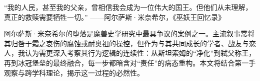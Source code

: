 \hspace*{2em} 
“我的人民，甚至我的父亲，曾相信我会成为一位伟大的国王。但他们从未理解，真正的救赎需要牺牲一切。”
——阿尔萨斯·米奈希尔，《巫妖王回忆录》

阿尔萨斯·米奈希尔的堕落是魔兽史学研究中最具争议的案例之一。主流叙事常将其归咎于霜之哀伤的腐蚀或耐奥祖的操控，但作为与其共同成长的学者、战友与恋人，我认为需更深入考察其行为逻辑的连续性：从斯坦索姆的“净化”到弑父称王，再到冰冠堡垒的最终融合，每一步都暗含对“责任”的病态重构。本文将结合第一手观察与跨学科理论，揭示这一过程的必然性\cite{medivh2030}。